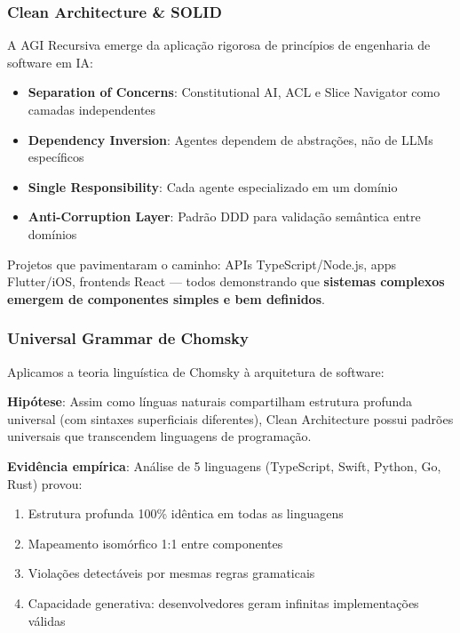 \documentclass[11pt]{article}
\begin{document}
\subsubsection{Clean Architecture \& SOLID}

A AGI Recursiva emerge da aplicação rigorosa de princípios de engenharia de software em IA:

\begin{itemize}
    \item \textbf{Separation of Concerns}: Constitutional AI, ACL e Slice Navigator como camadas independentes
    \item \textbf{Dependency Inversion}: Agentes dependem de abstrações, não de LLMs específicos
    \item \textbf{Single Responsibility}: Cada agente especializado em um domínio
    \item \textbf{Anti-Corruption Layer}: Padrão DDD para validação semântica entre domínios
\end{itemize}

Projetos que pavimentaram o caminho: APIs TypeScript/Node.js, apps Flutter/iOS, frontends React --- todos demonstrando que \textbf{sistemas complexos emergem de componentes simples e bem definidos}.

\subsubsection{Universal Grammar de Chomsky}

Aplicamos a teoria linguística de Chomsky à arquitetura de software:

\textbf{Hipótese}: Assim como línguas naturais compartilham estrutura profunda universal (com sintaxes superficiais diferentes), Clean Architecture possui padrões universais que transcendem linguagens de programação.

\textbf{Evidência empírica}: Análise de 5 linguagens (TypeScript, Swift, Python, Go, Rust) provou:
\begin{enumerate}
    \item Estrutura profunda 100\% idêntica em todas as linguagens
    \item Mapeamento isomórfico 1:1 entre componentes
    \item Violações detectáveis por mesmas regras gramaticais
    \item Capacidade generativa: desenvolvedores geram infinitas implementações válidas
\end{enumerate}
\end{document}
